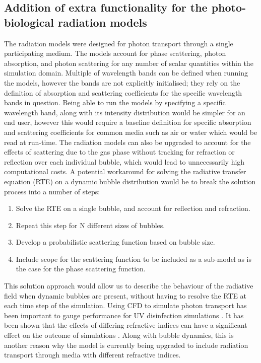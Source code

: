 \subsection{Addition of extra functionality for the photo-biological radiation models}
The radiation models were designed for photon transport through a single participating medium. The models account for phase scattering, photon absorption, and photon scattering for any number of scalar quantities within the simulation domain. Multiple of wavelength bands can be defined when running the models, however the bands are not explicitly initialised; they rely on the definition of absorption and scattering coefficients for the specific wavelength bands in question. Being able to run the models by specifying a specific wavelength band, along with its intensity distribution would be simpler for an end user, however this would require a baseline definition for specific absorption and scattering coefficients for common media such as air or water which would be read at run-time. 
\skippingparagraph
The radiation models can also be upgraded to account for the effects of scattering due to the gas phase without tracking for refraction or reflection over each individual bubble, which would lead to unnecessarily high computational costs. A potential workaround for solving the radiative transfer equation (RTE) on a dynamic bubble distribution would be to break the solution process into a number of steps:
\begin{enumerate}
    \item Solve the RTE on a single bubble, and account for reflection and refraction.
    \item Repeat this step for N different sizes of bubbles.
    \item Develop a probabilistic scattering function based on bubble size.
    \item Include scope for the scattering function to be included as a sub-model as is the case for the phase scattering function. 
\end{enumerate}
This solution approach would allow us to describe the behaviour of the radiative field when dynamic bubbles are present, without having to resolve the RTE at each time step of the simulation.
\skippingparagraph
Using CFD to simulate photon transport has been important to gauge performance for UV disinfection simulations \cite{crapulli2010}. It has been shown that the effects of differing refractive indices can have a significant effect on the outcome of simulations \cite{ho2009}. Along with bubble dynamics, this is another reason why the model is currently being upgraded to include radiation transport through media with different refractive indices.


